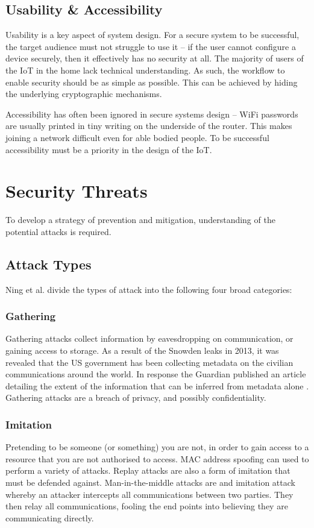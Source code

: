 \documentclass[10pt,journal,compsoc]{IEEEtran}
\begin{document}
\subsection{Usability \& Accessibility}
Usability is a key aspect of system design. For a secure system to be
successful, the target audience must not struggle to use it -- if the user
cannot configure a device securely, then it effectively has no security at all.
The majority of users of the IoT in the home lack technical understanding. As
such, the workflow to enable security should be as simple as possible. This can
be achieved by hiding the underlying cryptographic mechanisms. 

Accessibility has often been ignored in secure systems design -- WiFi passwords
are usually printed in tiny writing on the underside of the router. This makes
joining a network difficult even for able bodied people. To be successful
accessibility must be a priority in the design of the IoT.


\section{Security Threats}
To develop a strategy of prevention and mitigation, understanding of the
potential attacks is required.  

\subsection{Attack Types}
Ning et al. \cite{Ning2013} divide the types of attack into the following
four broad categories:

\subsubsection{Gathering}
Gathering attacks collect information by eavesdropping on communication, or
gaining access to storage. As a result of the Snowden leaks in 2013, it was
revealed that the US government has been collecting metadata on the civilian
communications around the world. In response the Guardian published an article
detailing the extent of the information that can be inferred from metadata
alone \cite{Guardian2013}. Gathering attacks are a breach of privacy, and
possibly confidentiality. 

\subsubsection{Imitation}
Pretending to be someone (or something) you are not, in order to gain access to
a resource that you are not authorised to access. MAC address spoofing can used
to perform a variety of attacks. Replay attacks are also a form of imitation
that must be defended against. Man-in-the-middle attacks are and imitation
attack whereby an attacker intercepts all communications between two parties.
They then relay all communications, fooling the end points into believing they
are communicating directly. 
\end{document}

